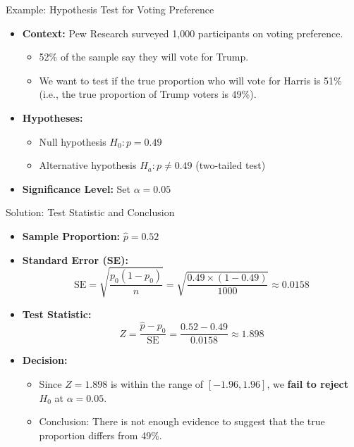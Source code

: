 \documentclass[handout]{beamer} %
\begin{document}
\begin{frame}{Example: Hypothesis Test for Voting Preference}
    \begin{itemize}
        \item \textbf{Context:} Pew Research surveyed 1,000 participants on voting preference.
        \begin{itemize}
            \item 52\% of the sample say they will vote for Trump.
            \item We want to test if the true proportion who will vote for Harris is 51\% (i.e., the true proportion of Trump voters is 49\%).
        \end{itemize}

        \item \textbf{Hypotheses:}
        \begin{itemize}
            \item Null hypothesis \( H_0: p = 0.49 \)
            \item Alternative hypothesis \( H_a: p \neq 0.49 \) (two-tailed test)
        \end{itemize}

        \item \textbf{Significance Level:} Set \( \alpha = 0.05 \)
    \end{itemize}
\end{frame}

\begin{frame}{Solution: Test Statistic and Conclusion}
    \begin{itemize}
        \item \textbf{Sample Proportion:} \( \hat{p} = 0.52 \)

        \item \textbf{Standard Error (SE):}
\[
        \text{SE} = \sqrt{\frac{p_0(1 - p_0)}{n}} = \sqrt{\frac{0.49 \times (1 - 0.49)}{1000}} \approx 0.0158
\]

        \item \textbf{Test Statistic:}
\[
        Z = \frac{\hat{p} - p_0}{\text{SE}} = \frac{0.52 - 0.49}{0.0158} \approx 1.898
\]

        \item \textbf{Decision:}
        \begin{itemize}
            \item Since \( Z = 1.898 \) is within the range of \( [-1.96, 1.96] \), we \textbf{fail to reject} \( H_0 \) at \( \alpha = 0.05 \).
            \item Conclusion: There is not enough evidence to suggest that the true proportion differs from 49\%.
        \end{itemize}
    \end{itemize}
\end{frame}
\end{document}
